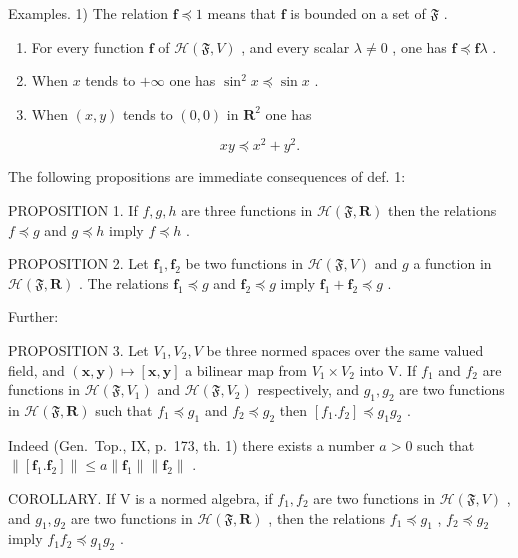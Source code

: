 Examples. 1) The relation \(\mathbf{f} \preccurlyeq 1\) means that \(\mathbf{f}\) is bounded on a set of \(\mathfrak{F}\) .

\begin{enumerate}
\def\labelenumi{\arabic{enumi})}
\setcounter{enumi}{1}
\item
  For every function \(\mathbf{f}\) of \(\mathcal{H}(\mathfrak{F}, V)\) , and every scalar \(\lambda \neq 0\) , one has \(\mathbf{f} \preccurlyeq \mathbf{f}\lambda\) .
\item
  When \(x\) tends to \(+\infty\) one has \(\sin^2 x \preccurlyeq \sin x\) .
\item
  When \((x,y)\) tends to \((0,0)\) in \(\mathbf{R}^2\) one has
\end{enumerate}

\[
x y \preccurlyeq x ^ {2} + y ^ {2}.
\]

The following propositions are immediate consequences of def. 1:

PROPOSITION 1. If \(f, g, h\) are three functions in \(\mathcal{H}(\mathfrak{F}, \mathbf{R})\) then the relations \(f \preccurlyeq g\) and \(g \preccurlyeq h\) imply \(f \preccurlyeq h\) .

PROPOSITION 2. Let \(\mathbf{f}_1, \mathbf{f}_2\) be two functions in \(\mathcal{H}(\mathfrak{F}, V)\) and \(g\) a function in \(\mathcal{H}(\mathfrak{F}, \mathbf{R})\) . The relations \(\mathbf{f}_1 \preccurlyeq g\) and \(\mathbf{f}_2 \preccurlyeq g\) imply \(\mathbf{f}_1 + \mathbf{f}_2 \preccurlyeq g\) .

Further:

PROPOSITION 3. Let \(V_{1}, V_{2}, V\) be three normed spaces over the same valued field, and \((\mathbf{x}, \mathbf{y}) \mapsto [\mathbf{x}, \mathbf{y}]\) a bilinear map from \(V_{1} \times V_{2}\) into V. If \(f_{1}\) and \(f_{2}\) are functions in \(\mathcal{H}(\mathfrak{F}, V_{1})\) and \(\mathcal{H}(\mathfrak{F}, V_{2})\) respectively, and \(g_{1}, g_{2}\) are two functions in \(\mathcal{H}(\mathfrak{F}, \mathbf{R})\) such that \(f_{1} \preccurlyeq g_{1}\) and \(f_{2} \preccurlyeq g_{2}\) then \([f_{1}.f_{2}] \preccurlyeq g_{1}g_{2}\) .

Indeed (Gen.~Top., IX, p.~173, th. 1) there exists a number \(a > 0\) such that \(\|[\mathbf{f}_1.\mathbf{f}_2]\| \leqslant a\|\mathbf{f}_1\|\|\mathbf{f}_2\|\) .

COROLLARY. If V is a normed algebra, if \(f_{1}, f_{2}\) are two functions in \(\mathcal{H}(\mathfrak{F}, V)\) , and \(g_{1}, g_{2}\) are two functions in \(\mathcal{H}(\mathfrak{F}, \mathbf{R})\) , then the relations \(f_{1} \preccurlyeq g_{1}\) , \(f_{2} \preccurlyeq g_{2}\) imply \(f_{1}f_{2} \preccurlyeq g_{1}g_{2}\) .

